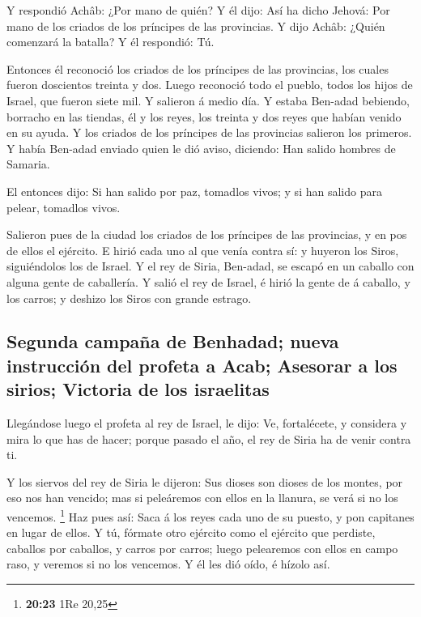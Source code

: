  Y respondió Achâb: ¿Por mano de quién? Y él dijo: Así ha
dicho Jehová: Por mano de los criados de los príncipes de las
provincias. Y dijo Achâb: ¿Quién comenzará la batalla? Y él respondió:
Tú.

 Entonces él reconoció los criados de los príncipes de
las provincias, los cuales fueron doscientos treinta y dos. Luego
reconoció todo el pueblo, todos los hijos de Israel, que fueron siete
mil.  Y salieron á medio día. Y estaba Ben-adad bebiendo,
borracho en las tiendas, él y los reyes, los treinta y dos reyes que
habían venido en su ayuda.  Y los criados de los
príncipes de las provincias salieron los primeros. Y había Ben-adad
enviado quien le dió aviso, diciendo: Han salido hombres de Samaria.

 El entonces dijo: Si han salido por paz, tomadlos vivos;
y si han salido para pelear, tomadlos vivos.

 Salieron pues de la ciudad los criados de los príncipes
de las provincias, y en pos de ellos el ejército.  E
hirió cada uno al que venía contra sí: y huyeron los Siros, siguiéndolos
los de Israel. Y el rey de Siria, Ben-adad, se escapó en un caballo con
alguna gente de caballería.  Y salió el rey de Israel, é
hirió la gente de á caballo, y los carros; y deshizo los Siros con
grande estrago.

\hypertarget{segunda-campauxf1a-de-benhadad-nueva-instrucciuxf3n-del-profeta-a-acab-asesorar-a-los-sirios-victoria-de-los-israelitas}{%
\subsection{Segunda campaña de Benhadad; nueva instrucción del profeta a
Acab; Asesorar a los sirios; Victoria de los
israelitas}\label{segunda-campauxf1a-de-benhadad-nueva-instrucciuxf3n-del-profeta-a-acab-asesorar-a-los-sirios-victoria-de-los-israelitas}}

 Llegándose luego el profeta al rey de Israel, le dijo:
Ve, fortalécete, y considera y mira lo que has de hacer; porque pasado
el año, el rey de Siria ha de venir contra ti.

 Y los siervos del rey de Siria le dijeron: Sus dioses
son dioses de los montes, por eso nos han vencido; mas si peleáremos con
ellos en la llanura, se verá si no los vencemos. \footnote{\textbf{20:23}
  1Re 20,25}  Haz pues así: Saca á los reyes cada uno de
su puesto, y pon capitanes en lugar de ellos.  Y tú,
fórmate otro ejército como el ejército que perdiste, caballos por
caballos, y carros por carros; luego pelearemos con ellos en campo raso,
y veremos si no los vencemos. Y él les dió oído, é hízolo así.

